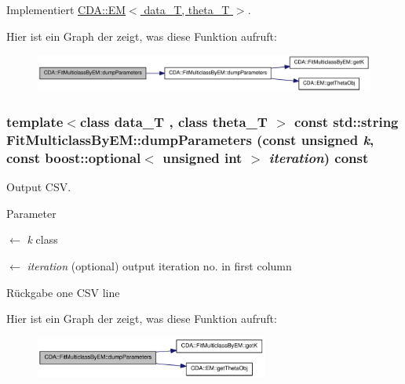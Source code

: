 Implementiert \hyperlink{classCDA_1_1EM_ad2deb0f1d94dc57a6e431caebeb34cbe}{CDA::EM$<$ data\_\-T, theta\_\-T $>$}.



Hier ist ein Graph der zeigt, was diese Funktion aufruft:\nopagebreak
\begin{figure}[H]
\begin{center}
\leavevmode
\includegraphics[width=337pt]{classCDA_1_1FitMulticlassByEM_abd04a7135250a427a100c95bf2bf43a9_cgraph}
\end{center}
\end{figure}


\hypertarget{classCDA_1_1FitMulticlassByEM_aa5598f1ced5c95045f59c99610ab53e5}{
\subsubsection[{dumpParameters}]{\setlength{\rightskip}{0pt plus 5cm}template$<$class data\_\-T , class theta\_\-T $>$ const std::string FitMulticlassByEM::dumpParameters (const unsigned {\em k}, \/  const boost::optional$<$ unsigned int $>$ {\em iteration}) const}}
\label{classCDA_1_1FitMulticlassByEM_aa5598f1ced5c95045f59c99610ab53e5}


Output CSV. 


\begin{DoxyParams}{Parameter}
\item[\mbox{$\leftarrow$} {\em k}]class \item[\mbox{$\leftarrow$} {\em iteration}](optional) output iteration no. in first column\end{DoxyParams}
\begin{DoxyReturn}{Rückgabe}
one CSV line 
\end{DoxyReturn}


Hier ist ein Graph der zeigt, was diese Funktion aufruft:\nopagebreak
\begin{figure}[H]
\begin{center}
\leavevmode
\includegraphics[width=217pt]{classCDA_1_1FitMulticlassByEM_aa5598f1ced5c95045f59c99610ab53e5_cgraph}
\end{center}
\end{figure}




